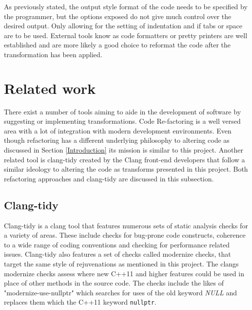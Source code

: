 \documentclass[bsc,frontabs,singlespacing,parskip,deptreport]{infthesis}
\begin{document}
As previously stated, the output style format of the code needs to be specified by the programmer, but the options exposed do not give much control over the desired output. Only allowing for the setting of indentation and if tabs or space are to be used. External tools know as code formatters or pretty printers are well established and are more likely a good choice to reformat the code after the transformation has been applied.

\section{Related work}
There exist a number of tools aiming to aide in the development of software by suggesting or implementing transformations. Code Re-factoring \cite{REFACTOR} is a well versed area with a lot of integration with modern development environments. Even though refactoring has a different underlying philosophy to altering code as discussed in Section \ref{Introduction} its mission is similar to this project. Another related tool is clang-tidy created by the Clang front-end developers that follow a similar ideology to altering the code as transforms presented in this project. Both refactoring approaches and clang-tidy are discussed in this subsection.

\subsection{Clang-tidy}\label{sec:rw-clang-tidy}
Clang-tidy \cite{CLANG_TIDY} is a clang tool that features numerous sets of static analysis checks for a variety of areas. These include checks for bug-prone code constructs, coherence to a wide range of coding conventions and checking for performance related issues. Clang-tidy also features a set of checks called modernize checks, that target the same style of rejuvenations as mentioned in this project. The clangs modernize checks assess where new C++11 and higher features could be used in place of other methods in the source code. The checks include the likes of "modernize-use-nullptr" which searches for uses of the old keyword \textit{NULL} and replaces them which the C++11 keyword \texttt{nullptr}.
\end{document}
